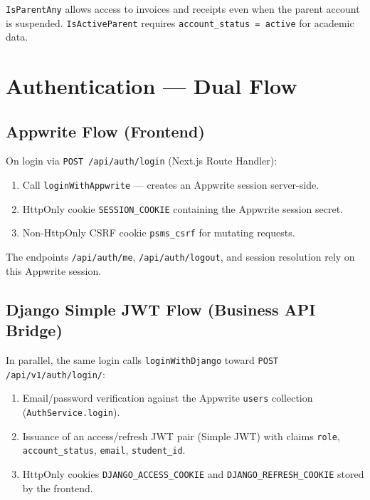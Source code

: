 \documentclass[11pt,a4paper]{article}
\begin{document}
\texttt{IsParentAny} allows access to invoices and receipts even when the parent account is suspended. \texttt{IsActiveParent} requires \texttt{account\_status = active} for academic data.

\section{Authentication --- Dual Flow}

\subsection{Appwrite Flow (Frontend)}

On login via \texttt{POST /api/auth/login} (Next.js Route Handler):

\begin{enumerate}[noitemsep]
    \item Call \texttt{loginWithAppwrite} --- creates an Appwrite session server-side.
    \item HttpOnly cookie \texttt{SESSION\_COOKIE} containing the Appwrite session secret.
    \item Non-HttpOnly CSRF cookie \texttt{psms\_csrf} for mutating requests.
\end{enumerate}

The endpoints \texttt{/api/auth/me}, \texttt{/api/auth/logout}, and session resolution rely on this Appwrite session.

\subsection{Django Simple JWT Flow (Business API Bridge)}

In parallel, the same login calls \texttt{loginWithDjango} toward \texttt{POST /api/v1/auth/login/}:

\begin{enumerate}[noitemsep]
    \item Email/password verification against the Appwrite \texttt{users} collection (\texttt{AuthService.login}).
    \item Issuance of an access/refresh JWT pair (Simple JWT) with claims \texttt{role}, \texttt{account\_status}, \texttt{email}, \texttt{student\_id}.
    \item HttpOnly cookies \texttt{DJANGO\_ACCESS\_COOKIE} and \texttt{DJANGO\_REFRESH\_COOKIE} stored by the frontend.
\end{enumerate}
\end{document}
